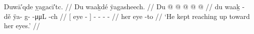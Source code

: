 \ex\label{ex:94-18-reach-eyes}%
%
\begingl
	\glpreamble	Duwā′qde ỵagacī′tc. //
	\glpreamble	Du waaḵdé ÿagasheech. //
	\gla	{} Du  @ {} {}
		 @ {} @ {} @ {} @ {} //
	\glb	{} du waaḵ -dě {}
		ÿa- g-  -μμL -ch //
	\glc	{}[  eye - {}]
		- -  - - //
	\gld	{} her eye -to {}
		 {} {} {} {} //
	\glft	‘He kept reaching up toward her eyes.’
		//
\endgl
\xe

